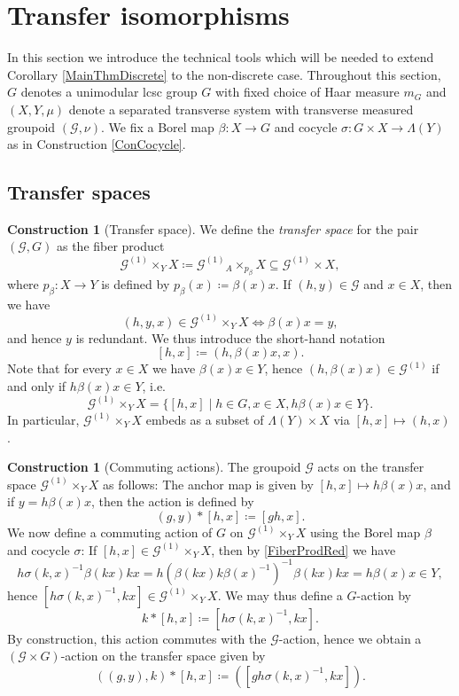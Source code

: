 \documentclass[11pt, oneside]{amsart}
\theoremstyle{definition}
\newtheorem{con}[lemma]{Construction}
\theoremstyle{remark}
\theoremstyle{TheoremNum}
\newcommand{\cG}{\mathcal{G}}
\begin{document}
\section{Transfer isomorphisms}\label{sec:trans:isom}
In this section we introduce the technical tools which will be needed to extend Corollary \ref{MainThmDiscrete} to the non-discrete case. Throughout this section, $G$ denotes a unimodular lcsc group $G$ with fixed choice of Haar measure $m_G$ and
 $(X, Y, \mu)$ denote a separated transverse system with transverse measured groupoid $(\cG, \nu)$. We fix a Borel map $\beta: X \to G$ and cocycle $\sigma: G\times X\to \Lambda(Y)$ as in Construction \ref{ConCocycle}.
\subsection{Transfer spaces}\label{sec:trans:space}
\begin{con}[Transfer space]\label{ConIso} We define the  \emph{transfer space} for the pair $(\cG, G)$ as
 the fiber product
\[\cG^{(1)}\times_{Y} X \coloneqq  \cG^{(1)} {}_A\times_{p_\beta} X \subseteq \cG^{(1)} \times X,\]
where $p_\beta: X \to Y$ is defined by $p_\beta(x) \coloneqq  \beta(x) x$.
If $(h,y) \in \cG$ and $x\in X$, then we have
\[
(h,y,x) \in \cG^{(1)}\times_{Y} X \iff \beta(x)x = y,
\]
and hence $y$ is redundant. We thus introduce the short-hand notation
\[
[h,x] \coloneqq  (h, \beta(x)x, x).
\]
Note that for every $x \in X$ we have $\beta(x)x \in Y$, hence $(h, \beta(x)x) \in \cG^{(1)}$ if and only if $h\beta(x)x \in Y$, i.e.\
\begin{equation}\label{FiberProdRed}
\cG^{(1)}\times_{Y} X = \{[h,x] \mid h \in G, x \in X,  h\beta(x)x \in Y\}.
\end{equation}
In particular, $\cG^{(1)} \times_Y X$ embeds as a subset of $\Lambda(Y) \times X$ via $[h,x] \mapsto (h,x)$.
\end{con}
\begin{con}[Commuting actions]\label{CommutingActions} The groupoid $\cG$ acts on the transfer space $\cG^{(1)} \times_Y X$ as follows: The anchor map is given by $[h,x] \mapsto h\beta(x)x$, and  if $y  = h\beta(x)x$, then the action is defined by
\[
(g, y)\ast [h,x] \coloneqq [gh, x].
\]
We now define a commuting action of $G$ on  $\cG^{(1)} \times_Y X$ using the Borel map $\beta$ and cocycle $\sigma$: If $[h,x] \in \cG^{(1)}\times_{Y} X$, then by \eqref{FiberProdRed} we have
\[
h\sigma(k,x)^{-1}\beta(kx)kx = h( \beta(kx)k\beta(x)^{-1})^{-1}\beta(kx)kx = h\beta(x)x \in Y,
\]
hence  $ [h\sigma(k,x)^{-1}, kx] \in \cG^{(1)}\times_{Y} X$. We may thus define a $G$-action by
\[
k \ast [h,x] \coloneqq [h\sigma(k,x)^{-1}, kx].
\]
By construction, this action commutes with the $\cG$-action, hence we obtain a $(\cG \times G)$-action on the transfer space given by
\begin{equation}\label{AstAction1}
((g, y), k) \ast [h,x] \coloneqq ([gh\sigma(k,x)^{-1}, kx]). \tag{$\ast$}
\end{equation}
\end{con}
\end{document}
